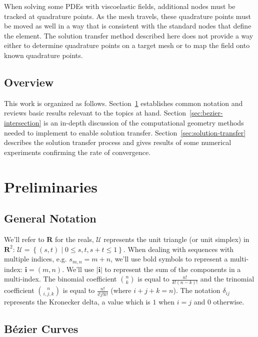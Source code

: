 \documentclass[letterpaper,10pt]{article}
\theoremstyle{definition}
\newcommand{\reals}{\mathbf{R}}
\newcommand{\utri}{\mathcal{U}}
\begin{document}
When solving some PDEs with viscoelastic fields, additional nodes must be
tracked at quadrature points. As the mesh travels, these quadrature points
must be moved as well in a way that is consistent with the standard
nodes that define the element. The solution transfer method described here
does not provide a way either to determine quadrature points on a
target mesh or to map the field onto known quadrature points.

\subsection{Overview}

This work is organized as follows. Section~\ref{sec:preliminaries}
establishes common notation and reviews basic results relevant to the
topics at hand. Section~\ref{sec:bezier-intersection} is an
in-depth discussion of the computational geometry methods needed
to implement to enable solution transfer. Section~\ref{sec:solution-transfer}
describes the solution transfer process and gives results of some
numerical experiments confirming the rate of convergence.

\section{Preliminaries}\label{sec:preliminaries}

\subsection{General Notation}

We'll refer to \(\reals\) for the reals, \(\utri\) represents
the unit triangle (or unit simplex) in \(\reals^2\):
\(\utri = \left\{(s, t) \mid 0 \leq s, t, s + t \leq 1\right\}\).
When dealing with sequences with multiple indices, e.g.
\(s_{m, n} = m + n\), we'll use bold symbols to represent
a multi-index: \(\bm{i} = (m, n)\). We'll use \(\left|\bm{i}\right|\) to
represent the sum of the components in a multi-index.
The binomial coefficient
\(\binom{n}{k}\) is equal to \(\frac{n!}{k! (n - k)!}\) and the trinomial
coefficient \(\binom{n}{i, j, k}\) is equal to \(\frac{n!}{i! j! k!}\)
(where \(i + j + k = n\)). The notation \(\delta_{ij}\) represents the
Kronecker delta, a value which is \(1\) when \(i = j\) and \(0\)
otherwise.

\subsection{B\'{e}zier Curves}
\end{document}

